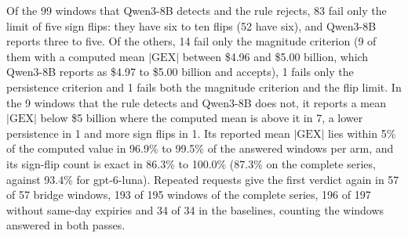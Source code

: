 Of the 99 windows that Qwen3-8B detects and the rule rejects, 83 fail only the limit of five sign flips: they have six to ten flips (52 have six), and Qwen3-8B reports three to five. Of the others, 14 fail only the magnitude criterion (9 of them with a computed mean $|\mathrm{GEX}|$ between \$4.96 and \$5.00 billion, which Qwen3-8B reports as \$4.97 to \$5.00 billion and accepts), 1 fails only the persistence criterion and 1 fails both the magnitude criterion and the flip limit. In the 9 windows that the rule detects and Qwen3-8B does not, it reports a mean $|\mathrm{GEX}|$ below \$5 billion where the computed mean is above it in 7, a lower persistence in 1 and more sign flips in 1. Its reported mean $|\mathrm{GEX}|$ lies within 5\% of the computed value in 96.9\% to 99.5\% of the answered windows per arm, and its sign-flip count is exact in 86.3\% to 100.0\% (87.3\% on the complete series, against 93.4\% for gpt-6-luna). Repeated requests give the first verdict again in 57 of 57 bridge windows, 193 of 195 windows of the complete series, 196 of 197 without same-day expiries and 34 of 34 in the baselines, counting the windows answered in both passes.

